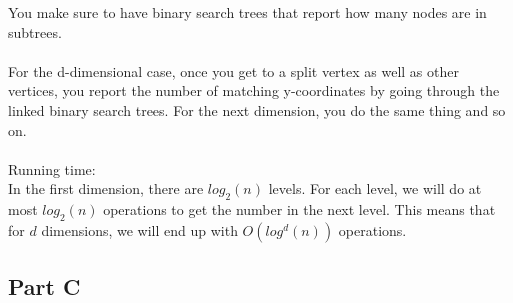 \documentclass[11pt,psfig]{article}
\begin{document}
You make sure to have binary search trees that report how many nodes are in subtrees. \\
\\
For the d-dimensional case, once you get to a split vertex as well as other vertices, you report the number of matching y-coordinates by going through the linked binary search trees. For the next dimension, you do the same thing and so on. \\
\\
Running time:\\
In the first dimension, there are $log_2(n)$ levels. For each level, we will do at most $log_2(n)$ operations to get the number in the next level. This means that for $d$ dimensions, we will end up with $O(log^d(n))$ operations. 
\\

\subsection*{Part C}


\end{document}
